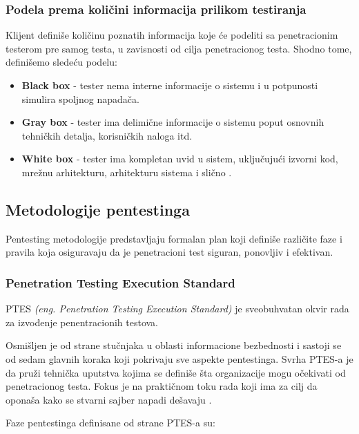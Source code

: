 \documentclass[a4paper,12pt]{article}
\begin{document}
\subsubsection{Podela prema količini informacija prilikom testiranja}
Klijent definiše količinu poznatih informacija koje će podeliti sa penetracionim testerom pre samog testa, u zavisnosti od cilja penetracionog testa. Shodno tome, definišemo sledeću podelu:
\begin{itemize}
  \item \textbf{Black box} - tester nema interne informacije o sistemu i u potpunosti simulira spoljnog napadača.
  \item \textbf{Gray box} - tester ima delimične informacije o sistemu poput osnovnih tehničkih detalja, korisničkih naloga itd.
  \item \textbf{White box} - tester ima kompletan uvid u sistem, uključujući izvorni kod, mrežnu arhitekturu, arhitekturu sistema i slično \cite{types-of-pentesting}.
\end{itemize}
\subsection{Metodologije pentestinga}
Pentesting metodologije predstavljaju formalan plan koji definiše različite faze i pravila koja osiguravaju da je penetracioni test siguran, ponovljiv i efektivan. 
\subsubsection{Penetration Testing Execution Standard}

PTES \textit{(eng. Penetration Testing Execution Standard)} je sveobuhvatan okvir rada za izvođenje penentracionih testova.

Osmišljen je od strane stučnjaka u oblasti informacione bezbednosti i sastoji se od sedam glavnih koraka koji pokrivaju sve aspekte pentestinga. Svrha PTES-a je da pruži tehnička uputstva kojima se definiše šta organizacije mogu očekivati od penetracionog testa. Fokus je na praktičnom toku rada koji ima za cilj da oponaša kako se stvarni sajber napadi dešavaju \cite{ibm_pentest_methodologies}.


Faze pentestinga definisane od strane PTES-a su: 
\end{document}
